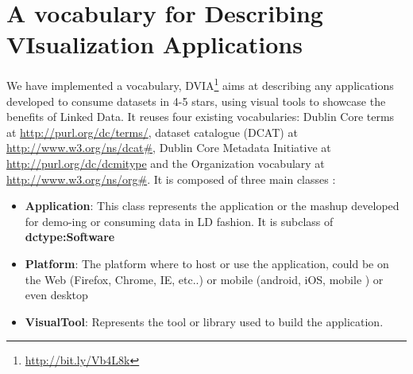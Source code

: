 \section{A vocabulary for Describing VIsualization Applications} \label{sec:dvia}

We have implemented a vocabulary, DVIA\footnote{\url{http://bit.ly/Vb4L8k}} aims at describing any applications developed to consume datasets in 4-5 stars, using visual tools to showcase the benefits of Linked Data. It reuses four existing vocabularies: Dublin Core terms at \url{http://purl.org/dc/terms/}, dataset catalogue (DCAT) at \url{http://www.w3.org/ns/dcat#}, Dublin Core Metadata Initiative at \url{http://purl.org/dc/dcmitype} and the Organization vocabulary at \url{http://www.w3.org/ns/org#}.  It is composed of three main classes : 

\begin{itemize}
\item \textbf{Application}: This class represents the application or the mashup developed for demo-ing or consuming data in LD fashion. It is subclass of \textbf{dctype:Software}
\item \textbf{Platform}: The platform where to host or use the application, could be on the Web (Firefox, Chrome, IE, etc..) or mobile (android, iOS, mobile ) or even desktop
\item \textbf{VisualTool}: Represents the tool or library used to build the application. 
\end{itemize}

